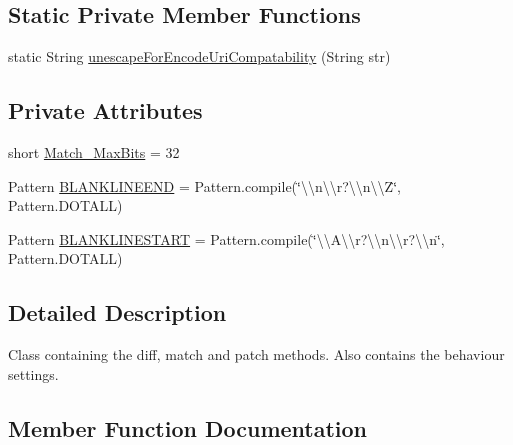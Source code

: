 \subsection*{Static Private Member Functions}
\begin{DoxyCompactItemize}
\item 
static String \hyperlink{classorg_1_1buildmlearn_1_1toolkit_1_1utilities_1_1diff__match__patch_a9d75398146ce57e61ecd72d0b6eddfcc}{unescape\+For\+Encode\+Uri\+Compatability} (String str)
\end{DoxyCompactItemize}
\subsection*{Private Attributes}
\begin{DoxyCompactItemize}
\item 
short \hyperlink{classorg_1_1buildmlearn_1_1toolkit_1_1utilities_1_1diff__match__patch_acbd6579dfcc52cec95ac2e657d068e74}{Match\+\_\+\+Max\+Bits} = 32
\item 
Pattern \hyperlink{classorg_1_1buildmlearn_1_1toolkit_1_1utilities_1_1diff__match__patch_ae160e1c07d0d2594bb8134dd507b5762}{B\+L\+A\+N\+K\+L\+I\+N\+E\+E\+ND} = Pattern.\+compile(\char`\"{}\textbackslash{}\textbackslash{}n\textbackslash{}\textbackslash{}r?\textbackslash{}\textbackslash{}n\textbackslash{}\textbackslash{}Z\char`\"{}, Pattern.\+D\+O\+T\+A\+LL)
\item 
Pattern \hyperlink{classorg_1_1buildmlearn_1_1toolkit_1_1utilities_1_1diff__match__patch_a8e0b9a30b90e431d81090b41a32ceaa1}{B\+L\+A\+N\+K\+L\+I\+N\+E\+S\+T\+A\+RT} = Pattern.\+compile(\char`\"{}\textbackslash{}\textbackslash{}A\textbackslash{}\textbackslash{}r?\textbackslash{}\textbackslash{}n\textbackslash{}\textbackslash{}r?\textbackslash{}\textbackslash{}n\char`\"{}, Pattern.\+D\+O\+T\+A\+LL)
\end{DoxyCompactItemize}


\subsection{Detailed Description}
Class containing the diff, match and patch methods. Also contains the behaviour settings. 

\subsection{Member Function Documentation}
